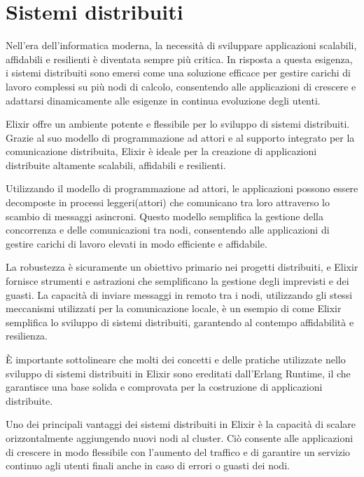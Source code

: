 \newpage

\section{Sistemi distribuiti}


Nell'era dell'informatica moderna, la necessità di
sviluppare applicazioni scalabili, affidabili e resilienti
è diventata sempre più critica.
In risposta a questa esigenza, i sistemi distribuiti sono
emersi come una soluzione efficace per gestire carichi
di lavoro complessi su più nodi di calcolo,
consentendo alle applicazioni di crescere e adattarsi
dinamicamente alle esigenze in continua evoluzione degli utenti.

Elixir offre un ambiente potente e flessibile
per lo sviluppo di sistemi distribuiti.
Grazie al suo modello di programmazione ad attori
e al supporto integrato per la comunicazione distribuita,
Elixir è ideale per la creazione di applicazioni distribuite
altamente scalabili, affidabili e resilienti.

Utilizzando il modello di programmazione ad attori,
le applicazioni possono essere decomposte in processi leggeri(attori)
che comunicano tra loro attraverso lo scambio di messaggi asincroni.
Questo modello semplifica la gestione della concorrenza
e delle comunicazioni tra nodi, consentendo alle applicazioni di
gestire carichi di lavoro elevati in modo efficiente e affidabile.

La robustezza è sicuramente un obiettivo primario nei progetti
distribuiti, e Elixir fornisce strumenti e astrazioni che semplificano
la gestione degli imprevisti e dei guasti.
La capacità di inviare messaggi in remoto tra i nodi,
utilizzando gli stessi meccanismi utilizzati per la comunicazione
locale, è un esempio di come Elixir semplifica lo sviluppo di
sistemi distribuiti, garantendo al contempo affidabilità e resilienza.

È importante sottolineare che molti dei concetti e delle pratiche
utilizzate nello sviluppo di sistemi distribuiti in Elixir
sono ereditati dall'Erlang Runtime, il che garantisce una base
solida e comprovata per la costruzione di applicazioni distribuite.

Uno dei principali vantaggi dei sistemi distribuiti
in Elixir è la capacità di scalare orizzontalmente aggiungendo
nuovi nodi al cluster. 
Ciò consente alle applicazioni di crescere in modo flessibile
con l'aumento del traffico e di garantire un servizio continuo
agli utenti finali anche in caso di errori o guasti dei nodi.

